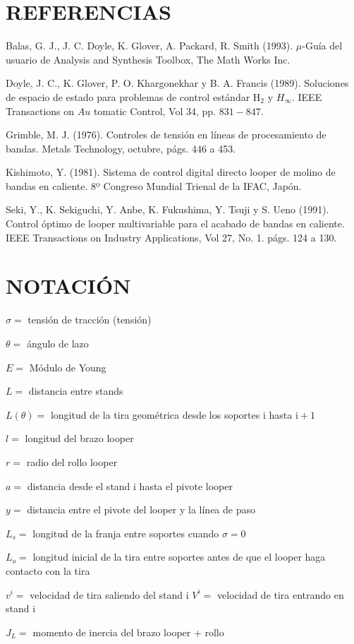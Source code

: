 \section{REFERENCIAS}
Balas, G. J., J. C. Doyle, K. Glover, A. Packard, R. Smith (1993). $\mu$-Guía del usuario de Analysis and Synthesis Toolbox, The Math Works Inc.

Doyle, J. C., K. Glover, P. O. Khargonekhar y B. A. Francis (1989). Soluciones de espacio de estado para problemas de control estándar $\mathrm{H}_{2}$ y $H_{\infty}$. IEEE Transactions on $A u$ tomatic Control, Vol 34, pp. $831-847 .$

Grimble, M. J. (1976). Controles de tensión en líneas de procesamiento de bandas. Metals Technology, octubre, págs. 446 a 453.

Kishimoto, Y. (1981). Sistema de control digital directo looper de molino de bandas en caliente. 8º Congreso Mundial Trienal de la IFAC, Japón.

Seki, Y., K. Sekiguchi, Y. Anbe, K. Fukushima, Y. Tsuji y S. Ueno (1991). Control óptimo de looper multivariable para el acabado de bandas en caliente. IEEE Transactions on Industry Applications, Vol 27, No. 1. págs. 124 a 130.

\section{NOTACIÓN}
$\sigma=$ tensión de tracción (tensión)

$\theta=$ ángulo de lazo

$E=$ Módulo de Young

$L=$ distancia entre stands

$L(\theta)=$ longitud de la tira geométrica desde los soportes i hasta $\mathrm{i}+1$

$l=$ longitud del brazo looper

$r=$ radio del rollo looper

$a=$ distancia desde el stand i hasta el pivote looper

$y=$ distancia entre el pivote del looper y la línea de paso

$L_{s}=$ longitud de la franja entre soportes cuando $\sigma=0$

$L_{o}=$ longitud inicial de la tira entre soportes antes de que el looper haga contacto con la tira

$v^{i}=$ velocidad de tira saliendo del stand $\mathrm{i}$ $V^{i}=$ velocidad de tira entrando en stand $\mathrm{i}$

$J_{L}=$ momento de inercia del brazo looper + rollo

